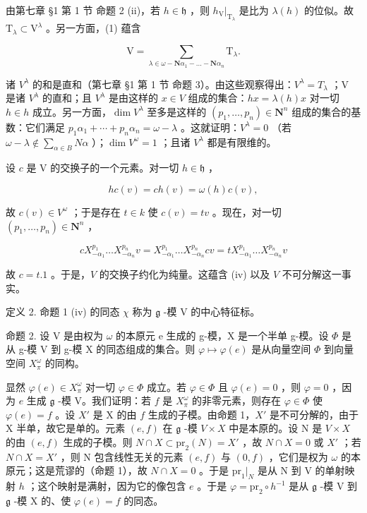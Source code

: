 由第七章 §1 第 1 节 命题 2 (ii)，若 \(h \in \mathfrak{h}\) ，则 \(h_{\mathrm{V}}|_{\mathrm{T}_{\lambda}}\) 是比为 \(\lambda(h)\) 的位似。故 \(\mathrm{T}_{\lambda} \subset \mathrm{V}^{\lambda}\) 。另一方面，(1) 蕴含

\[
\mathrm{V} = \sum_ {\lambda \in \omega - \mathbf {N} \alpha_ {1} - \dots - \mathbf {N} \alpha_ {n}} \mathrm{T} _ {\lambda}.
\]

诸 \(V^{\lambda}\) 的和是直和（第七章 §1 第 1 节 命题 3）。由这些观察得出：\(V^{\lambda} = T_{\lambda}\) ；V 是诸 \(V^{\lambda}\) 的直和；且 \(V^{\lambda}\) 是由这样的 \(x \in V\) 组成的集合：\(hx = \lambda(h)x\) 对一切 \(h \in h\) 成立。另一方面，\(\dim V^{\lambda}\) 至多是这样的 \((p_{1}, \ldots, p_{n}) \in \mathbf{N}^{n}\) 组成的集合的基数：它们满足 \(p_{1}\alpha_{1} + \cdots + p_{n}\alpha_{n} = \omega - \lambda\) 。这就证明：\(V^{\lambda} = 0\) （若 \(\omega - \lambda \notin \sum_{\alpha \in B} N\alpha\) ）；\(\dim V^{\omega} = 1\) ；且诸 \(V^{\lambda}\) 都是有限维的。

设 \(c\) 是 V 的交换子的一个元素。对一切 \(h \in \mathfrak{h}\) ，

\[
h c (v) = c h (v) = \omega (h) c (v),
\]

故 \(c(v) \in V^{\omega}\) ；于是存在 \(t \in k\) 使 \(c(v) = tv\) 。现在，对一切 \((p_1, \ldots, p_n) \in \mathbf{N}^n\) ，

\[
c X _ {- \alpha_ {1}} ^ {p _ {1}} \dots X _ {- \alpha_ {n}} ^ {p _ {n}} v = X _ {- \alpha_ {1}} ^ {p _ {1}} \dots X _ {- \alpha_ {n}} ^ {p _ {n}} c v = t X _ {- \alpha_ {1}} ^ {p _ {1}} \dots X _ {- \alpha_ {n}} ^ {p _ {n}} v
\]

故 \(c = t.1\) 。于是，\(V\) 的交换子约化为纯量。这蕴含 (iv) 以及 \(V\) 不可分解这一事实。

定义 2. 命题 1 (iv) 的同态 \(\chi\) 称为 \(\mathfrak{g}\) -模 V 的中心特征标。

命题 2. 设 V 是由权为 \(\omega\) 的本原元 e 生成的 g-模，X 是一个半单 g-模。设 \(\Phi\) 是从 g-模 V 到 g-模 X 的同态组成的集合。则 \(\varphi\mapsto\varphi(e)\) 是从向量空间 \(\Phi\) 到向量空间 \(X_{\pi}^{\omega}\) 的同构。

显然 \(\varphi(e) \in X_{\pi}^{\omega}\) 对一切 \(\varphi \in \Phi\) 成立。若 \(\varphi \in \Phi\) 且 \(\varphi(e) = 0\) ，则 \(\varphi = 0\) ，因为 \(e\) 生成 \(\mathfrak{g}\) -模 V。我们证明：若 \(f\) 是 \(X_{\pi}^{\omega}\) 的非零元素，则存在 \(\varphi \in \Phi\) 使 \(\varphi(e) = f\) 。设 \(X'\) 是 X 的由 \(f\) 生成的子模。由命题 1，\(X'\) 是不可分解的，由于 X 半单，故它是单的。元素 \((e, f)\) 在 \(\mathfrak{g}\) -模 \(V \times X\) 中是本原的。设 N 是 \(V \times X\) 的由 \((e, f)\) 生成的子模。则 \(N \cap X \subset \mathrm{pr}_2(N) = X'\) ，故 \(N \cap X = 0\) 或 \(X'\) ；若 \(N \cap X = X'\) ，则 N 包含线性无关的元素 \((e, f)\) 与 \((0, f)\) ，它们是权为 \(\omega\) 的本原元；这是荒谬的（命题 1），故 \(N \cap X = 0\) 。于是 \(\mathrm{pr}_1|_{N}\) 是从 N 到 V 的单射映射 \(h\) ；这个映射是满射，因为它的像包含 \(e\) 。于是 \(\varphi = \mathrm{pr}_2 \circ h^{-1}\) 是从 \(\mathfrak{g}\) -模 V 到 \(\mathfrak{g}\) -模 X 的、使 \(\varphi(e) = f\) 的同态。


